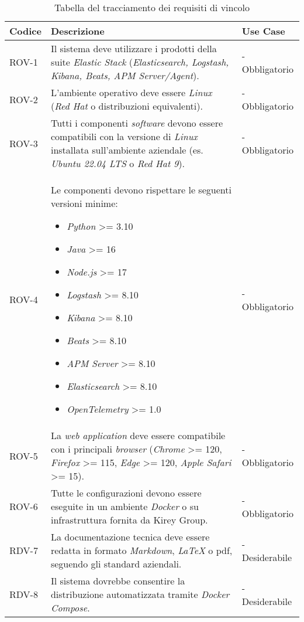 \begin{table}[H]
\caption{Tabella del tracciamento dei requisiti di vincolo}
\label{tab:requisiti-vincolo}
\begin{tabularx}{\textwidth}{lXl}
\hline\hline
\textbf{Codice} & \textbf{Descrizione} & \textbf{Use Case}\\
\hline
ROV-1    & Il sistema deve utilizzare i prodotti della suite \emph{Elastic Stack} (\emph{Elasticsearch, Logstash, Kibana, Beats, APM Server/Agent}). & - Obbligatorio \\
\hline

\hline
ROV-2    & L'ambiente operativo deve essere \emph{Linux} (\emph{Red Hat} o distribuzioni equivalenti). & - Obbligatorio \\
\hline

\hline
ROV-3    & Tutti i componenti \emph{software} devono essere compatibili con la versione di \emph{Linux} installata sull'ambiente aziendale (es. \emph{Ubuntu 22.04 LTS} o \emph{Red Hat 9}). & - Obbligatorio \\
\hline

\hline
ROV-4    & Le componenti devono rispettare le seguenti versioni minime:

\begin{itemize}
    \item \emph{Python} >= 3.10
    \item \emph{Java} >= 16
    \item \emph{Node.js} >= 17
    \item \emph{Logstash} >= 8.10
    \item \emph{Kibana} >= 8.10
    \item \emph{Beats} >= 8.10
    \item \emph{APM Server} >= 8.10
    \item \emph{Elasticsearch} >= 8.10
    \item \emph{OpenTelemetry} >= 1.0
\end{itemize}& - Obbligatorio \\
\hline

\hline
ROV-5    & La \emph{web application} deve essere compatibile con i principali \emph{browser} (\emph{Chrome} >= 120, \emph{Firefox} >= 115, \emph{Edge} >= 120, \emph{Apple Safari} >= 15). & - Obbligatorio \\
\hline

\hline
ROV-6    & Tutte le configurazioni devono essere eseguite in un ambiente \emph{Docker} o su infrastruttura fornita da Kirey Group. & - Obbligatorio \\
\hline

\hline
RDV-7    & La documentazione tecnica deve essere redatta in formato \emph{Markdown}, \emph{LaTeX} o \gls{pdf}, seguendo gli standard aziendali. & - Desiderabile \\
\hline

\hline
RDV-8    & Il sistema dovrebbe consentire la distribuzione automatizzata tramite \emph{Docker Compose}. & - Desiderabile \\
\hline

\end{tabularx}
\end{table}

